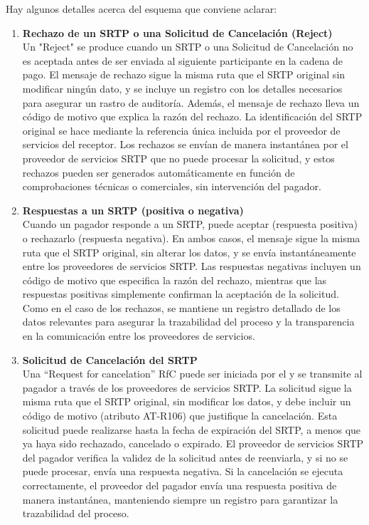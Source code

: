 Hay algunos detalles acerca del esquema que conviene aclarar:
\begin{enumerate}
  \item \textbf{Rechazo de un SRTP o una Solicitud de Cancelación (Reject)} \\
        Un "Reject" se produce cuando un SRTP o una Solicitud de Cancelación no es aceptada antes de ser enviada al siguiente participante en la cadena de pago. El mensaje de rechazo sigue la misma ruta que el SRTP original sin modificar ningún dato, y se incluye un registro con los detalles necesarios para asegurar un rastro de auditoría. Además, el mensaje de rechazo lleva un código de motivo que explica la razón del rechazo. La identificación del SRTP original se hace mediante la referencia única incluida por el proveedor de servicios del receptor. Los rechazos se envían de manera instantánea por el proveedor de servicios SRTP que no puede procesar la solicitud, y estos rechazos pueden ser generados automáticamente en función de comprobaciones técnicas o comerciales, sin intervención del pagador.

  \item \textbf{Respuestas a un SRTP (positiva o negativa)} \\
        Cuando un pagador responde a un SRTP, puede aceptar (respuesta positiva) o rechazarlo (respuesta negativa). En ambos casos, el mensaje sigue la misma ruta que el SRTP original, sin alterar los datos, y se envía instantáneamente entre los proveedores de servicios SRTP. Las respuestas negativas incluyen un código de motivo que especifica la razón del rechazo, mientras que las respuestas positivas simplemente confirman la aceptación de la solicitud. Como en el caso de los rechazos, se mantiene un registro detallado de los datos relevantes para asegurar la trazabilidad del proceso y la transparencia en la comunicación entre los proveedores de servicios.

  \item \textbf{Solicitud de Cancelación del SRTP} \\
        Una “Request for cancelation” RfC puede ser iniciada por el y se transmite al pagador a través de los proveedores de servicios SRTP. La solicitud sigue la misma ruta que el SRTP original, sin modificar los datos, y debe incluir un código de motivo (atributo AT-R106) que justifique la cancelación. Esta solicitud puede realizarse hasta la fecha de expiración del SRTP, a menos que ya haya sido rechazado, cancelado o expirado. El proveedor de servicios SRTP del pagador verifica la validez de la solicitud antes de reenviarla, y si no se puede procesar, envía una respuesta negativa. Si la cancelación se ejecuta correctamente, el proveedor del pagador envía una respuesta positiva de manera instantánea, manteniendo siempre un registro para garantizar la trazabilidad del proceso.
\end{enumerate}
